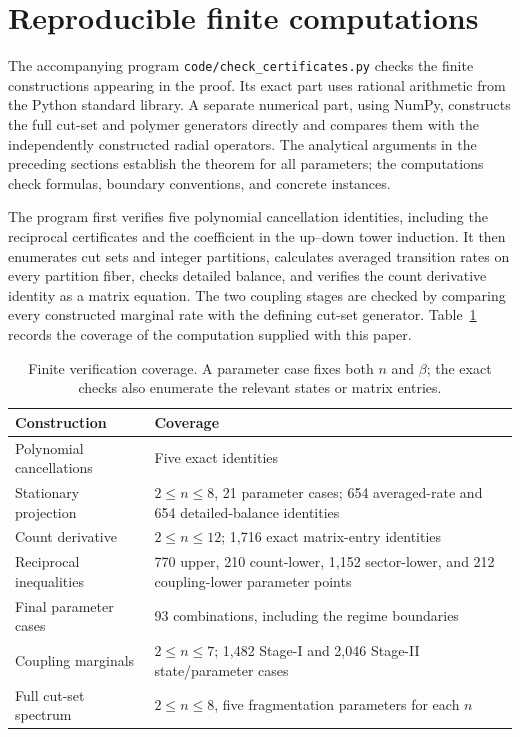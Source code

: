 \section{Reproducible finite computations}\label{app:computations}

The accompanying program \texttt{code/check\_certificates.py} checks the finite constructions appearing in the proof. Its exact part uses rational arithmetic from the Python standard library. A separate numerical part, using NumPy, constructs the full cut-set and polymer generators directly and compares them with the independently constructed radial operators. The analytical arguments in the preceding sections establish the theorem for all parameters; the computations check formulas, boundary conventions, and concrete instances.

The program first verifies five polynomial cancellation identities, including the reciprocal certificates and the coefficient in the up--down tower induction. It then enumerates cut sets and integer partitions, calculates averaged transition rates on every partition fiber, checks detailed balance, and verifies the count derivative identity as a matrix equation. The two coupling stages are checked by comparing every constructed marginal rate with the defining cut-set generator. Table~\ref{tab:checks} records the coverage of the computation supplied with this paper.

\begin{table}[ht]
\centering
\caption{Finite verification coverage. A parameter case fixes both $n$ and $\beta$; the exact checks also enumerate the relevant states or matrix entries.}
\label{tab:checks}
\small
\begin{tabular}{@{}p{}p{}@{}}
\toprule
Construction & Coverage \\
\midrule
Polynomial cancellations & Five exact identities \\
Stationary projection & $2\le n\le8$, 21 parameter cases; 654 averaged-rate and 654 detailed-balance identities \\
Count derivative & $2\le n\le12$; 1,716 exact matrix-entry identities \\
Reciprocal inequalities & 770 upper, 210 count-lower, 1,152 sector-lower, and 212 coupling-lower parameter points \\
Final parameter cases & 93 combinations, including the regime boundaries \\
Coupling marginals & $2\le n\le7$; 1,482 Stage-I and 2,046 Stage-II state/parameter cases \\
Full cut-set spectrum & $2\le n\le8$, five fragmentation parameters for each $n$ \\
\bottomrule
\end{tabular}
\end{table}

